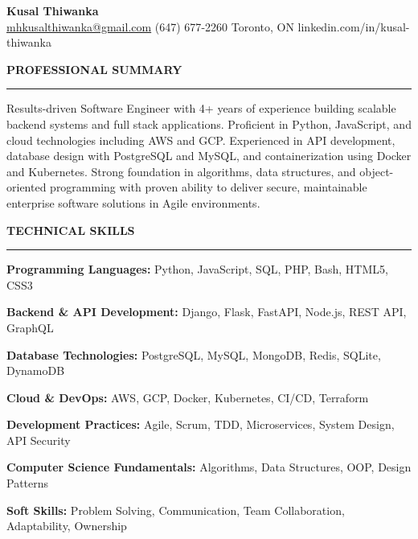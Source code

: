 \documentclass[10pt,letterpaper]{article}
\begin{document}
\begin{center}
{\LARGE\textbf{Kusal Thiwanka}}\\[3pt]
\href{mailto:mhkusalthiwanka@gmail.com}{mhkusalthiwanka@gmail.com}\hspace{2em}%
(647) 677{-}2260\hspace{2em}%
Toronto, ON\hspace{2em}
linkedin.com/in/kusal-thiwanka
\end{center}

\vspace{6pt}

\textbf{PROFESSIONAL SUMMARY}\\[-8pt]
\noindent\rule{\textwidth}{1pt}

\vspace{-2pt}

Results-driven Software Engineer with 4+ years of experience building scalable backend systems and full stack applications. Proficient in Python, JavaScript, and cloud technologies including AWS and GCP. Experienced in API development, database design with PostgreSQL and MySQL, and containerization using Docker and Kubernetes. Strong foundation in algorithms, data structures, and object-oriented programming with proven ability to deliver secure, maintainable enterprise software solutions in Agile environments.

\vspace{8pt}

\textbf{TECHNICAL SKILLS}\\[-8pt]
\noindent\rule{\textwidth}{1pt}

\vspace{-2pt}

\textbf{Programming Languages:} Python, JavaScript, SQL, PHP, Bash, HTML5, CSS3

\textbf{Backend \& API Development:} Django, Flask, FastAPI, Node.js, REST API, GraphQL

\textbf{Database Technologies:} PostgreSQL, MySQL, MongoDB, Redis, SQLite, DynamoDB

\textbf{Cloud \& DevOps:} AWS, GCP, Docker, Kubernetes, CI/CD, Terraform

\textbf{Development Practices:} Agile, Scrum, TDD, Microservices, System Design, API Security

\textbf{Computer Science Fundamentals:} Algorithms, Data Structures, OOP, Design Patterns

\textbf{Soft Skills:} Problem Solving, Communication, Team Collaboration, Adaptability, Ownership
\end{document}

